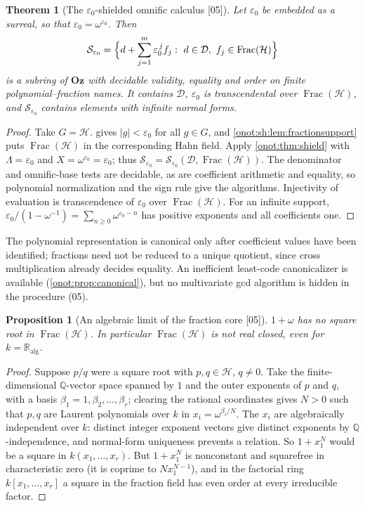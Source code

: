 \documentclass[11pt,oneside]{article}
\numberwithin{equation}{section}
\newtheorem{theorem}{Theorem}[section]
\newtheorem{proposition}[proposition]{Proposition}
\theoremstyle{definition}
\theoremstyle{remark}
\newcommand{\Oz}{\mathbf{Oz}}
\newcommand{\Q}{\mathbb Q}
\newcommand{\R}{\mathbb R}
\newcommand{\Ralg}{\R_{\mathrm{alg}}}
\newcommand{\Hh}{\mathcal H}
\newcommand{\Dd}{\mathcal D}
\newcommand{\FH}{\operatorname{Frac}(\mathcal H)}
\newcommand{\SE}{\mathcal S_{\varepsilon_0}}
\newcommand{\src}[1]{\textup{\textsf{\small[#1]}}}
\begin{document}
\begin{theorem}[The $\varepsilon_0$-shielded omnific calculus \src{05}]\label{onot:sh:thm:epsilon}
Let $\varepsilon_0$ be embedded as a surreal, so that $\varepsilon_0=\omega^{\varepsilon_0}$. Then
\begin{equation}\label{onot:sh:eq:calculus}
 \SE=\Bigl\{d+\sum_{j=1}^m\varepsilon_0^{\,j}f_j:\ d\in\Dd,\ f_j\in\FH\Bigr\}
\end{equation}
is a subring of $\Oz$ with decidable validity, equality and order on finite
polynomial--fraction names. It contains $\Dd$, $\varepsilon_0$ is transcendental
over $\FH$, and $\SE$ contains elements with infinite normal forms.
\end{theorem}
\begin{proof}
Take $G=\Hh$.  gives $|g|<\varepsilon_0$ for all
$g\in G$, and \cref{onot:sh:lem:fractionsupport} puts $\FH$ in the corresponding
Hahn field. Apply \cref{onot:thm:shield} with $\Lambda=\varepsilon_0$ and
$X=\omega^{\varepsilon_0}=\varepsilon_0$; thus $\SE=\mathcal
S_{\varepsilon_0}(\Dd,\FH)$. The denominator and omnific-base tests are
decidable, as are coefficient arithmetic and equality, so polynomial
normalization and the sign rule give the algorithms. Injectivity of evaluation
is transcendence of $\varepsilon_0$ over $\FH$. For an infinite support,
$\varepsilon_0/(1-\omega^{-1})=\sum_{n\ge0}\omega^{\varepsilon_0-n}$ has positive
exponents and all coefficients one.
\end{proof}

The polynomial representation is canonical only after coefficient values have
been identified; fractions need not be reduced to a unique quotient, since cross
multiplication already decides equality. An inefficient least-code
canonicalizer is available (\cref{onot:prop:canonical}), but no multivariate gcd
algorithm is hidden in the procedure (05).

\begin{proposition}[An algebraic limit of the fraction core \src{05}]\label{onot:sh:prop:notrealclosed}
$1+\omega$ has no square root in $\FH$. In particular $\FH$ is not real closed,
even for $k=\Ralg$.
\end{proposition}
\begin{proof}
Suppose $p/q$ were a square root with $p,q\in\Hh$, $q\ne0$. Take the
finite-dimensional $\Q$-vector space spanned by $1$ and the outer exponents of
$p$ and $q$, with a basis $\beta_1=1,\beta_2,\ldots,\beta_r$; clearing the
rational coordinates gives $N>0$ such that $p,q$ are Laurent polynomials over $k$
in $x_i=\omega^{\beta_i/N}$. The $x_i$ are algebraically independent over $k$:
distinct integer exponent vectors give distinct exponents by $\Q$-independence,
and normal-form uniqueness prevents a relation. So $1+x_1^N$ would be a square in
$k(x_1,\ldots,x_r)$. But $1+x_1^N$ is nonconstant and squarefree in
characteristic zero (it is coprime to $Nx_1^{N-1}$), and in the factorial ring
$k[x_1,\ldots,x_r]$ a square in the fraction field has even order at every
irreducible factor.
\end{proof}
\end{document}

